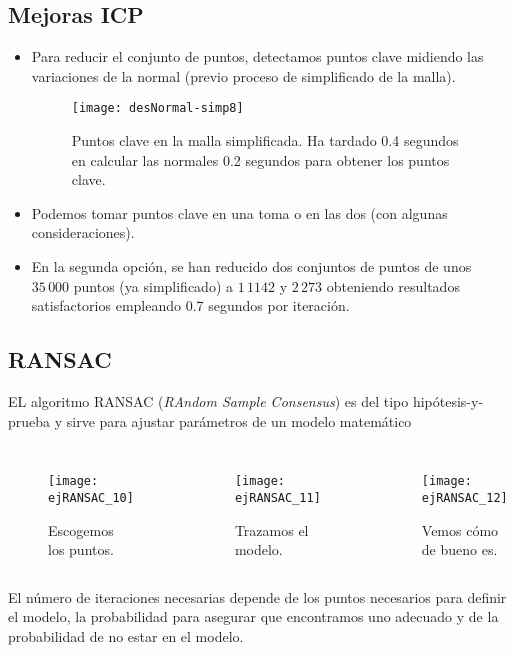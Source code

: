 \documentclass[9pt]{beamer}
\begin{document}
	\subsection{Mejoras ICP}
	\begin{frame}
		\justifying
		\begin{itemize}
			\item Para reducir el conjunto de puntos, detectamos puntos clave midiendo las variaciones de la normal (previo proceso de simplificado de la malla).
			
			\begin{figure}[h!]
				\texttt{[image: desNormal-simp8]}
				\caption{Puntos clave en la malla simplificada. Ha tardado 0.4 segundos en calcular las normales 0.2 segundos para obtener los puntos clave.}
			\end{figure} 
			
			\item Podemos tomar puntos clave en una toma o en las dos (con algunas consideraciones).
			\item En la segunda opción, se han reducido dos conjuntos de puntos de unos $ 35\,000 $ puntos (ya simplificado) a $ 1\,1142 $ y $ 2\,273 $ obteniendo resultados satisfactorios empleando 0.7 segundos por iteración.
		\end{itemize}
		
		
	\end{frame}

	\subsection{RANSAC}
	\begin{frame}
		\justifying
		EL algoritmo RANSAC (\textit{RAndom Sample Consensus}) es del tipo hipótesis-y-prueba y sirve para ajustar parámetros de un modelo matemático
		
		\begin{columns}
			\column{0.33\textwidth}
			\begin{figure}[h!]
				\texttt{[image: ejRANSAC\_10]}
				\caption{Escogemos los puntos.}
			\end{figure}
			\column{0.33\textwidth}
			\begin{figure}[h!]
				\texttt{[image: ejRANSAC\_11]}
				\caption{Trazamos el modelo.}
			\end{figure} 
			\column{0.33\textwidth}
			\begin{figure}[h!]
				\texttt{[image: ejRANSAC\_12]}
				\caption{Vemos cómo de bueno es.}
			\end{figure} 
		\end{columns}
		El número de iteraciones necesarias depende de los puntos necesarios para definir el modelo, la probabilidad para asegurar que encontramos uno adecuado y de la probabilidad de no estar en el modelo.
	\end{frame}	
\end{document}
